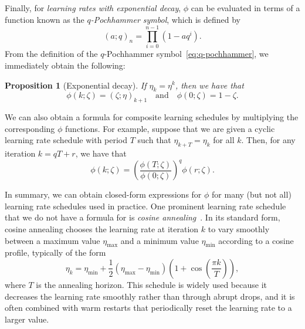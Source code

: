 \documentclass[11pt]{article}
\newtheorem{proposition}[theorem]{Proposition}
\begin{document}
Finally, for \emph{learning rates with exponential decay}, $\phi$ can be evaluated in terms of a function known as the \emph{$q$-Pochhammer symbol}, which is defined by
\begin{equation} \label{eq:q-pochhammer}
    (a; q)_n = \prod_{i=0}^{n-1} (1 - aq^i).
\end{equation}
From the definition of the $q$-Pochhammer symbol~\eqref{eq:q-pochhammer}, we immediately obtain the following:

\begin{proposition}[Exponential decay] \label{prop:exponential}
If $\eta_k = \eta^k$, then we have that
\begin{equation}
    \phi(k; \zeta) = (\zeta; \eta)_{k+1} \quad \text{and} \quad \phi(0; \zeta) = 1 - \zeta.
\end{equation}
\end{proposition}

We can also obtain a formula for composite learning schedules by multiplying the corresponding $\phi$ functions. For example, suppose that we are given a cyclic learning rate schedule with period $T$ such that $\eta_{k+T} = \eta_k$ for all $k$. Then, for any iteration $k = qT + r$, we have that
\begin{equation}
    \phi(k;\zeta) = \left(\frac{\phi(T;\zeta)}{\phi(0;\zeta)} \right)^q \phi(r;\zeta).
\end{equation}

In summary, we can obtain closed-form expressions for $\phi$ for many (but not all) learning rate schedules used in practice.
One prominent learning rate schedule that we do not have a formula for is \emph{cosine annealing}~\cite{loshchilov2017sgdr}. In its standard form, cosine annealing chooses the learning rate at iteration $k$ to vary smoothly between a maximum value $\eta_{\mathrm{max}}$ and a minimum value $\eta_{\mathrm{min}}$ according to a cosine profile, typically of the form
\begin{equation} \label{eq:cosine_annealing}
    \eta_k = \eta_{\mathrm{min}} + \frac{1}{2}(\eta_{\mathrm{max}} - \eta_{\mathrm{min}}) \left( 1 + \cos\!\left(\frac{\pi k}{T}\right) \right),
\end{equation}
where $T$ is the annealing horizon. This schedule is widely used because it decreases the learning rate smoothly rather than through abrupt drops, and it is often combined with warm restarts that periodically reset the learning rate to a larger value.
\end{document}

